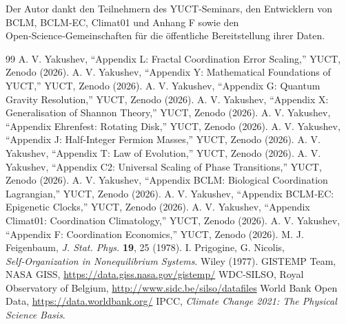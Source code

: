 \documentclass[12pt,a4paper]{article}
\begin{document}
	Der Autor dankt den Teilnehmern des YUCT‑Seminars, den Entwicklern von BCLM, BCLM‑EC, Climat01 und Anhang F
	sowie den Open‑Science‑Gemeinschaften für die öffentliche Bereitstellung ihrer Daten.
	
	\begin{thebibliography}{99}
		 A. V. Yakushev, ``Appendix L: Fractal Coordination Error Scaling,'' YUCT, Zenodo (2026).
		 A. V. Yakushev, ``Appendix Y: Mathematical Foundations of YUCT,'' YUCT, Zenodo (2026).
		 A. V. Yakushev, ``Appendix G: Quantum Gravity Resolution,'' YUCT, Zenodo (2026).
		 A. V. Yakushev, ``Appendix X: Generalisation of Shannon Theory,'' YUCT, Zenodo (2026).
		 A. V. Yakushev, ``Appendix Ehrenfest: Rotating Disk,'' YUCT, Zenodo (2026).
		 A. V. Yakushev, ``Appendix J: Half‑Integer Fermion Masses,'' YUCT, Zenodo (2026).
		 A. V. Yakushev, ``Appendix T: Law of Evolution,'' YUCT, Zenodo (2026).
		 A. V. Yakushev, ``Appendix C2: Universal Scaling of Phase Transitions,'' YUCT, Zenodo (2026).
		 A. V. Yakushev, ``Appendix BCLM: Biological Coordination Lagrangian,'' YUCT, Zenodo (2026).
		 A. V. Yakushev, ``Appendix BCLM‑EC: Epigenetic Clocks,'' YUCT, Zenodo (2026).
		 A. V. Yakushev, ``Appendix Climat01: Coordination Climatology,'' YUCT, Zenodo (2026).
		 A. V. Yakushev, ``Appendix F: Coordination Economics,'' YUCT, Zenodo (2026).
		 M. J. Feigenbaum, \emph{J. Stat. Phys.} \textbf{19}, 25 (1978).
		 I. Prigogine, G. Nicolis, \emph{Self‑Organization in Nonequilibrium Systems}. Wiley (1977).
		 GISTEMP Team, NASA GISS, \url{https://data.giss.nasa.gov/gistemp/}
		 WDC‑SILSO, Royal Observatory of Belgium, \url{http://www.sidc.be/silso/datafiles}
		 World Bank Open Data, \url{https://data.worldbank.org/}
		 IPCC, \emph{Climate Change 2021: The Physical Science Basis}.
	\end{thebibliography}
	
\end{document}
